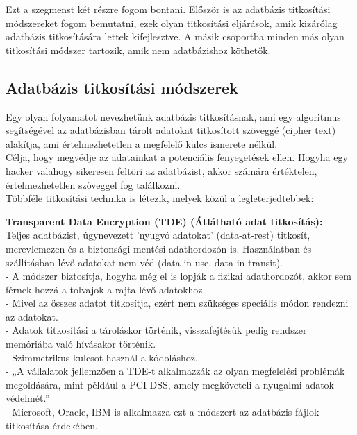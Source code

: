 \newpage
{}

Ezt a szegmenst két részre fogom bontani. Először is az adatbázis titkosítási módszereket fogom bemutatni, ezek olyan titkosítási eljárások, amik kizárólag adatbázis titkosítására lettek kifejlesztve. A másik csoportba minden más olyan titkosítási módszer tartozik, amik nem adatbázishoz köthetők.

\subsection{Adatbázis titkosítási módszerek} 

Egy olyan folyamatot nevezhetünk adatbázis titkosításnak, ami egy algoritmus segítségével az adatbázisban tárolt adatokat titkosított szöveggé (cipher text) alakítja, ami értelmezhetetlen a megfelelő kulcs ismerete nélkül.
\\Célja, hogy megvédje az adatainkat a potenciális fenyegetések ellen. Hogyha egy hacker valahogy sikeresen feltöri az adatbázist, akkor számára értéktelen, értelmezhetetlen szöveggel fog találkozni.
\\Többféle titkosítási technika is létezik, melyek közül a legleterjedtebbek:\newline

\noindent\textbf{Transparent Data Encryption (TDE) (Átlátható adat titkosítás):}\newline
\noindent - Teljes adatbázist, úgynevezett ’nyugvó adatokat’ (data-at-rest) titkosít, merevlemezen és a biztonsági mentési adathordozón is. Használatban és szállításban lévő adatokat nem véd (data-in-use, data-in-transit).
\\- A módszer biztosítja, hogyha még el is lopják a fizikai adathordozót, akkor sem férnek hozzá a tolvajok a rajta lévő adatokhoz.
\\- Mivel az összes adatot titkosítja, ezért nem szükséges speciális módon rendezni az adatokat.
\\- Adatok titkosítási a tároláskor történik, visszafejtésük pedig rendszer memóriába való hívásakor történik.
\\- Szimmetrikus kulcsot használ a kódoláshoz.
\\- „A vállalatok jellemzően a TDE-t alkalmazzák az olyan megfelelési problémák megoldására, mint például a PCI DSS, amely megköveteli a nyugalmi adatok védelmét.”
\\- Microsoft, Oracle, IBM is alkalmazza ezt a módszert az adatbázis fájlok titkosítása érdekében.

